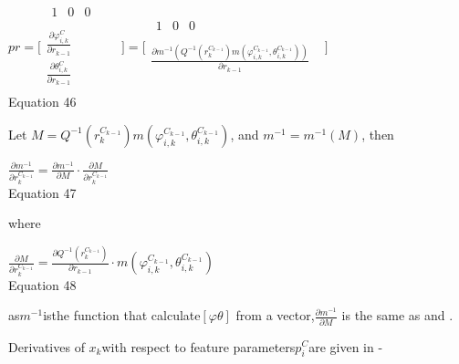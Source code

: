 $pr=\lbrack \begin{matrix}
\begin{matrix}
1 & 0 & 0 & \\
\end{matrix}
 & \\
\frac{\partial \varphi _{i, k}^{C}}{\partial r_{k-1}} & \\
\frac{\partial \theta _{i, k}^{C}}{\partial r_{k-1}} & \\
\end{matrix}
\rbrack =\lbrack \begin{matrix}
\begin{matrix}
1 & 0 & 0 & \\
\end{matrix}
 & \\
\frac{\partial m^{-1}(Q^{-1}(r_{k}^{C_{k-1}})m(\varphi _{i, 
k}^{C_{k-1}}, \theta _{i, k}^{C_{k-1}}))}{\partial r_{k-1}} & \\
\end{matrix}
\rbrack $\\


Equation 46

Let $M=Q^{-1}(r_{k}^{C_{k-1}})m(\varphi _{i, k}^{C_{k-1}}, \theta _{i, 
k}^{C_{k-1}})$, and $m^{-1}=m^{-1}(M)$, then

$\frac{\partial m^{-1}}{\partial r_{k}^{C_{k-1}}}=\frac{\partial 
m^{-1}}{\partial M}\cdot \frac{\partial M}{\partial r_{k}^{C_{k-1}}}$
\\


Equation 47

where

$\frac{\partial M}{\partial r_{k}^{C_{k-1}}}= \frac{\partial 
Q^{-1}(r_{k}^{C_{k-1}})}{\partial r_{k-1}}\cdot m(\varphi _{i, 
k}^{C_{k-1}}, \theta _{i, k}^{C_{k-1}})$\\


Equation 48

as$m^{-1}$isthe function that calculate$[\varphi \theta ]$ from a 
vector,$\frac{\partial m^{-1}}{\partial M}$ is the same as and .

Derivatives of $x_{k}$with respect to feature parameters$p_{i}^{C}
$are given in - 

